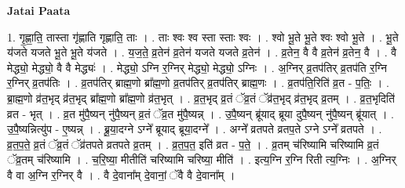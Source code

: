 \documentclass[17pt]{extarticle}
\begin{document}
\textbf{Jatai Paata} \newline

1. गृ॒ह्णा॒ति॒ तास्ता गृ॑ह्णाति गृह्णाति॒ ताः । . ताः श्वः श्व स्ता स्ताः श्वः । . श्वो भू॒ते भू॒ते श्वः श्वो भू॒ते । . भू॒ते य॑जते यजते भू॒ते भू॒ते य॑जते । . य॒ज॒ते॒ व्र॒तेन॑ व्र॒तेन॑ यजते यजते व्र॒तेन॑ । . व्र॒तेन॒ वै वै व्र॒तेन॑ व्र॒तेन॒ वै । . वै मेद्ध्यो॒ मेद्ध्यो॒ वै वै मेद्ध्यः॑ । . मेद्ध्यो॒ ऽग्नि र॒ग्निर् मेद्ध्यो॒ मेद्ध्यो॒ ऽग्निः । . अ॒ग्निर् व्र॒तप॑तिर् व्र॒तप॑ति र॒ग्नि र॒ग्निर् व्र॒तप॑तिः । . व्र॒तप॑तिर् ब्राह्म॒णो ब्रा᳚ह्म॒णो व्र॒तप॑तिर् व्र॒तप॑तिर् ब्राह्म॒णः । . व्र॒तप॑ति॒रिति॑ व्र॒त - प॒तिः॒ । . ब्रा॒ह्म॒णो व्र॑त॒भृद् व्र॑त॒भृद् ब्रा᳚ह्म॒णो ब्रा᳚ह्म॒णो व्र॑त॒भृत् । . व्र॒त॒भृद् व्र॒तं ॅव्र॒तं ॅव्र॑त॒भृद् व्र॑त॒भृद् व्र॒तम् । . व्र॒त॒भृदिति॑ व्रत - भृत् । . व्र॒त मु॑पै॒ष्यन् नु॑पै॒ष्यन् व्र॒तं ॅव्र॒त मु॑पै॒ष्यन्न् । . उ॒पै॒ष्यन् ब्रू॑याद् ब्रूया दुपै॒ष्यन् नु॑पै॒ष्यन् ब्रू॑यात् । . उ॒पै॒ष्यन्नित्यु॑प - ए॒ष्यन्न् । . ब्रू॒या॒दग्ने ऽग्ने᳚ ब्रूयाद् ब्रूया॒दग्ने᳚ । . अग्ने᳚ व्रतपते व्रतप॒ते ऽग्ने ऽग्ने᳚ व्रतपते । . व्र॒त॒प॒ते॒ व्र॒तं ॅव्र॒तं ॅव्र॑तपते व्रतपते व्र॒तम् । . व्र॒त॒प॒त॒ इति॑ व्रत - प॒ते॒ । . व्र॒तम् च॑रिष्यामि चरिष्यामि व्र॒तं ॅव्र॒तम् च॑रिष्यामि । . च॒रि॒ष्या॒ मीतीति॑ चरिष्यामि चरिष्या॒ मीति॑ । . इत्य॒ग्नि र॒ग्नि रिती त्य॒ग्निः । . अ॒ग्निर् वै वा अ॒ग्नि र॒ग्निर् वै । . वै दे॒वाना᳚म् दे॒वानां॒ ॅवै वै दे॒वाना᳚म् । \newline
\end{document}
